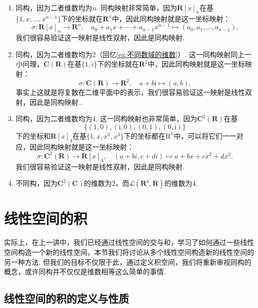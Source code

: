 \begin{solution}
    \begin{enumerate}
        \item 同构，因为二者维数均为$n$. 同构映射非常简单，因为$\mathbf{R}[x]_n$在基$\{1,x,\ldots,x^{n-1}\}$下的坐标就在$\mathbf{R}^n$中，因此同构映射就是这一坐标映射：
              \[\sigma:\mathbf{R}[x]_n\to\mathbf{R}^n,\quad a_0+a_1x+\cdots+a_{n-1}x^{n-1}\mapsto(a_0,a_1,\ldots,a_{n-1}).\]
              我们很容易验证这一映射是线性双射，因此是同构映射.

        \item 同构，因为二者维数均为2（回忆\autoref{ex:不同数域的维数}）. 这一同构映射同上一小问理，$\mathbf{C}(\mathbf{R})$在基$\{1,i\}$下的坐标就在$\mathbf{R}^2$中，因此同构映射就是这一坐标映射：
              \[\sigma:\mathbf{C}(\mathbf{R})\to\mathbf{R}^2,\quad a+b\mathrm{i}\mapsto(a,b).\]
              事实上这就是将复数在二维平面中的表示，我们很容易验证这一映射是线性双射，因此是同构映射..

        \item 同构，因为二者维数均为4. 这一同构映射也非常简单，因为$\mathbf{C}^2(\mathbf{R})$在基
              \[\{(1,0),(\mathrm{i},0),(0,1),(0,\mathrm{i})\}\]
              下的坐标和$\mathbf{R}[x]_4$在基$\{1,x,x^2,x^3\}$下的坐标都在$\mathrm{R}^n$中，可以将它们一一对应，因此同构映射就是这一坐标映射：
              \[\sigma:\mathbf{C}^2(\mathbf{R})\to\mathbf{R}[x]_4,\quad (a+bi,c+di)\mapsto a+bx+cx^2+dx^3.\]
              我们很容易验证这一映射是线性双射，因此是同构映射.

        \item 不同构，因为$\mathbf{C}^2(\mathbf{C})$的维数为2，而$\mathcal{L}(\mathbf{R}^4,\mathbf{R})$的维数为4.
    \end{enumerate}
\end{solution}

\section{线性空间的积}

实际上，在上一讲中，我们已经通过线性空间的交与和，学习了如何通过一些线性空间构造一个新的线性空间，本节我们将讨论从多个线性空间构造新的线性空间的另一种方法. 但我们的目标不仅限于此，通过定义积空间，我们将重新审视同构的概念，或许同构并不仅仅是维数相等这么简单的事情.

\subsection{线性空间的积的定义与性质}

